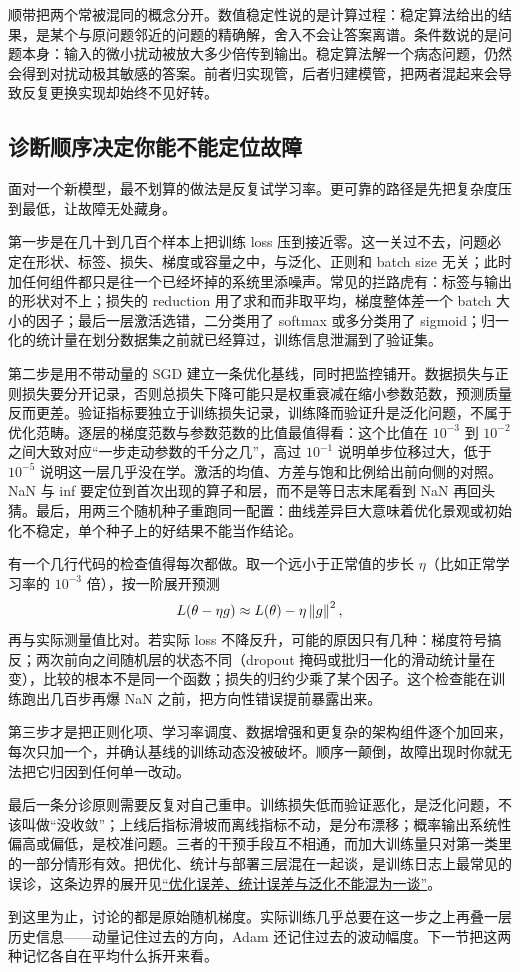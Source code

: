 顺带把两个常被混同的概念分开。数值稳定性说的是计算过程：稳定算法给出的结果，是某个与原问题邻近的问题的精确解，舍入不会让答案离谱。条件数说的是问题本身：输入的微小扰动被放大多少倍传到输出。稳定算法解一个病态问题，仍然会得到对扰动极其敏感的答案。前者归实现管，后者归建模管，把两者混起来会导致反复更换实现却始终不见好转。

\subsection{诊断顺序决定你能不能定位故障}

面对一个新模型，最不划算的做法是反复试学习率。更可靠的路径是先把复杂度压到最低，让故障无处藏身。

第一步是在几十到几百个样本上把训练 loss 压到接近零。这一关过不去，问题必定在形状、标签、损失、梯度或容量之中，与泛化、正则和 batch size 无关；此时加任何组件都只是往一个已经坏掉的系统里添噪声。常见的拦路虎有：标签与输出的形状对不上；损失的 reduction 用了求和而非取平均，梯度整体差一个 batch 大小的因子；最后一层激活选错，二分类用了 softmax 或多分类用了 sigmoid；归一化的统计量在划分数据集之前就已经算过，训练信息泄漏到了验证集。

第二步是用不带动量的 SGD 建立一条优化基线，同时把监控铺开。数据损失与正则损失要分开记录，否则总损失下降可能只是权重衰减在缩小参数范数，预测质量反而更差。验证指标要独立于训练损失记录，训练降而验证升是泛化问题，不属于优化范畴。逐层的梯度范数与参数范数的比值最值得看：这个比值在 \(10^{-3}\) 到 \(10^{-2}\) 之间大致对应``一步走动参数的千分之几''，高过 \(10^{-1}\) 说明单步位移过大，低于 \(10^{-5}\) 说明这一层几乎没在学。激活的均值、方差与饱和比例给出前向侧的对照。NaN 与 inf 要定位到首次出现的算子和层，而不是等日志末尾看到 NaN 再回头猜。最后，用两三个随机种子重跑同一配置：曲线差异巨大意味着优化景观或初始化不稳定，单个种子上的好结果不能当作结论。

有一个几行代码的检查值得每次都做。取一个远小于正常值的步长 \(\eta\)（比如正常学习率的 \(10^{-3}\) 倍），按一阶展开预测
\[
L(\theta-\eta g)\approx L(\theta)-\eta\left\lVert g\right\rVert^2,
\]
再与实际测量值比对。若实际 loss 不降反升，可能的原因只有几种：梯度符号搞反；两次前向之间随机层的状态不同（dropout 掩码或批归一化的滑动统计量在变），比较的根本不是同一个函数；损失的归约少乘了某个因子。这个检查能在训练跑出几百步再爆 NaN 之前，把方向性错误提前暴露出来。

第三步才是把正则化项、学习率调度、数据增强和更复杂的架构组件逐个加回来，每次只加一个，并确认基线的训练动态没被破坏。顺序一颠倒，故障出现时你就无法把它归因到任何单一改动。

最后一条分诊原则需要反复对自己重申。训练损失低而验证恶化，是泛化问题，不该叫做``没收敛''；上线后指标滑坡而离线指标不动，是分布漂移；概率输出系统性偏高或偏低，是校准问题。三者的干预手段互不相通，而加大训练量只对第一类里的一部分情形有效。把优化、统计与部署三层混在一起谈，是训练日志上最常见的误诊，这条边界的展开见\hyperref[sec:09-Convex-Optimization/08-Nonconvex-and-Stochastic-Optimization/06]{``优化误差、统计误差与泛化不能混为一谈''}。

到这里为止，讨论的都是原始随机梯度。实际训练几乎总要在这一步之上再叠一层历史信息——动量记住过去的方向，Adam 还记住过去的波动幅度。下一节把这两种记忆各自在平均什么拆开来看。

